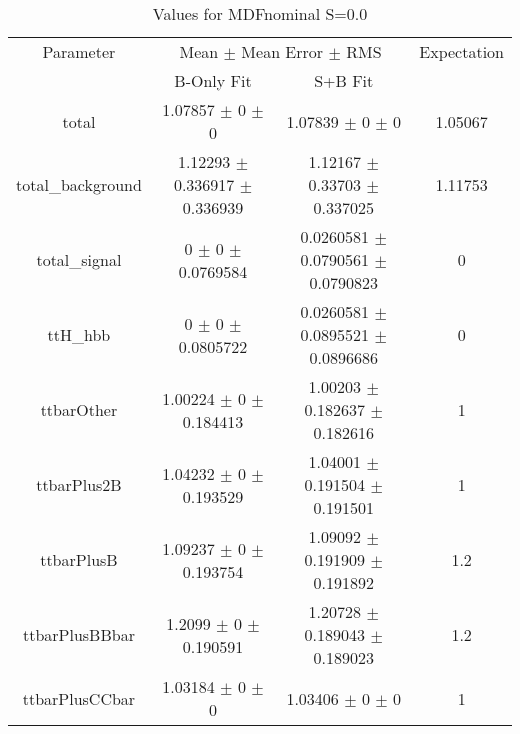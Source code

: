 \begin{table}
\centering
\caption{Values for MDFnominal S=0.0}
\begin{tabular}{cccc}
\toprule
Parameter & \multicolumn{2}{c}{Mean $\pm$ Mean Error $\pm$ RMS} & Expectation\\
 & B-Only Fit & S+B Fit & \\
\midrule
total & \num{1.07857} $\pm$ \num{0} $\pm$ \num{0} & \num{1.07839} $\pm$ \num{0} $\pm$ \num{0} & \num{1.05067}\\
total\_background & \num{1.12293} $\pm$ \num{0.336917} $\pm$ \num{0.336939} & \num{1.12167} $\pm$ \num{0.33703} $\pm$ \num{0.337025} & \num{1.11753}\\
total\_signal & \num{0} $\pm$ \num{0} $\pm$ \num{0.0769584} & \num{0.0260581} $\pm$ \num{0.0790561} $\pm$ \num{0.0790823} & \num{0}\\
ttH\_hbb & \num{0} $\pm$ \num{0} $\pm$ \num{0.0805722} & \num{0.0260581} $\pm$ \num{0.0895521} $\pm$ \num{0.0896686} & \num{0}\\
ttbarOther & \num{1.00224} $\pm$ \num{0} $\pm$ \num{0.184413} & \num{1.00203} $\pm$ \num{0.182637} $\pm$ \num{0.182616} & \num{1}\\
ttbarPlus2B & \num{1.04232} $\pm$ \num{0} $\pm$ \num{0.193529} & \num{1.04001} $\pm$ \num{0.191504} $\pm$ \num{0.191501} & \num{1}\\
ttbarPlusB & \num{1.09237} $\pm$ \num{0} $\pm$ \num{0.193754} & \num{1.09092} $\pm$ \num{0.191909} $\pm$ \num{0.191892} & \num{1.2}\\
ttbarPlusBBbar & \num{1.2099} $\pm$ \num{0} $\pm$ \num{0.190591} & \num{1.20728} $\pm$ \num{0.189043} $\pm$ \num{0.189023} & \num{1.2}\\
ttbarPlusCCbar & \num{1.03184} $\pm$ \num{0} $\pm$ \num{0} & \num{1.03406} $\pm$ \num{0} $\pm$ \num{0} & \num{1}\\
\bottomrule
\end{tabular}
\end{table}
